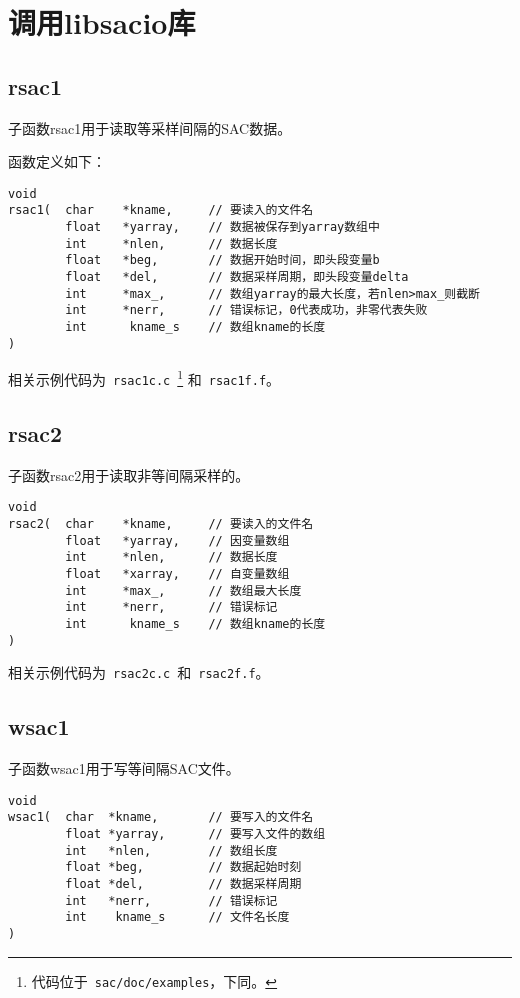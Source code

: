 \section{调用libsacio库}
\subsection{rsac1}
子函数rsac1用于读取等采样间隔的SAC数据。

函数定义如下：
\begin{verbatim}
void
rsac1(  char    *kname,     // 要读入的文件名
        float   *yarray,    // 数据被保存到yarray数组中
        int     *nlen,      // 数据长度
        float   *beg,       // 数据开始时间，即头段变量b
        float   *del,       // 数据采样周期，即头段变量delta
        int     *max_,      // 数组yarray的最大长度，若nlen>max_则截断
        int     *nerr,      // 错误标记，0代表成功，非零代表失败
        int      kname_s    // 数组kname的长度
)
\end{verbatim}

相关示例代码为~\verb+rsac1c.c+~\footnote{代码位于~\verb+sac/doc/examples+，下同。}
和~\verb+rsac1f.f+。

\subsection{rsac2}
子函数rsac2用于读取非等间隔采样的。
\begin{verbatim}
void
rsac2(  char    *kname,     // 要读入的文件名
        float   *yarray,    // 因变量数组
        int     *nlen,      // 数据长度
        float   *xarray,    // 自变量数组
        int     *max_,      // 数组最大长度
        int     *nerr,      // 错误标记
        int      kname_s    // 数组kname的长度
)
\end{verbatim}
相关示例代码为~\verb+rsac2c.c+~和~\verb+rsac2f.f+。

\subsection{wsac1}
子函数wsac1用于写等间隔SAC文件。
\begin{verbatim}
void
wsac1(  char  *kname,       // 要写入的文件名
        float *yarray,      // 要写入文件的数组
        int   *nlen,        // 数组长度
        float *beg,         // 数据起始时刻
        float *del,         // 数据采样周期
        int   *nerr,        // 错误标记
        int    kname_s      // 文件名长度
)
\end{verbatim}


